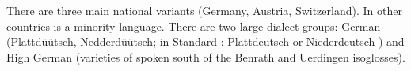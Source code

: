 
There are three main national variants (Germany, Austria, Switzerland). In other countries  is
a minority language. There are two large dialect groups: German (Plattdüütsch,
Nedderdüütsch; in Standard : Platt\-deutsch or Nie\-der\-deutsch%
) and High German (varieties of  spoken south of the Benrath and Uerdingen
isoglosses).






